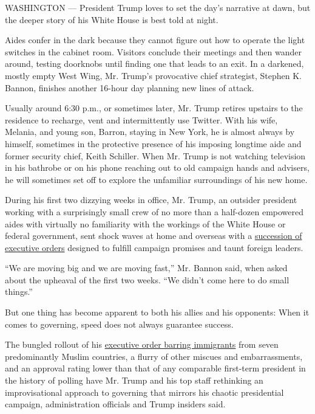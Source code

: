 WASHINGTON --- President Trump loves to set the day's narrative at dawn,
but the deeper story of his White House is best told at night.

Aides confer in the dark because they cannot figure out how to operate
the light switches in the cabinet room. Visitors conclude their meetings
and then wander around, testing doorknobs until finding one that leads
to an exit. In a darkened, mostly empty West Wing, Mr. Trump's
provocative chief strategist, Stephen K. Bannon, finishes another
16-hour day planning new lines of attack.

Usually around 6:30 p.m., or sometimes later, Mr. Trump retires upstairs
to the residence to recharge, vent and intermittently use Twitter. With
his wife, Melania, and young son, Barron, staying in New York, he is
almost always by himself, sometimes in the protective presence of his
imposing longtime aide and former security chief, Keith Schiller. When
Mr. Trump is not watching television in his bathrobe or on his phone
reaching out to old campaign hands and advisers, he will sometimes set
off to explore the unfamiliar surroundings of his new home.

During his first two dizzying weeks in office, Mr. Trump, an outsider
president working with a surprisingly small crew of no more than a
half-dozen empowered aides with virtually no familiarity with the
workings of the White House or federal government, sent shock waves at
home and overseas with a
\href{https://www.nytimes3xbfgragh.onion/interactive/2017/us/politics/trump-agenda-tracker.html?_r=0}{succession
of executive orders} designed to fulfill campaign promises and taunt
foreign leaders.

``We are moving big and we are moving fast,'' Mr. Bannon said, when
asked about the upheaval of the first two weeks. ``We didn't come here
to do small things.''

But one thing has become apparent to both his allies and his opponents:
When it comes to governing, speed does not always guarantee success.

The bungled rollout of his
\href{https://www.nytimes3xbfgragh.onion/2017/01/29/us/trump-refugee-ban-muslim-executive-order.html}{executive
order barring immigrants} from seven predominantly Muslim countries, a
flurry of other miscues and embarrassments, and an approval rating lower
than that of any comparable first-term president in the history of
polling have Mr. Trump and his top staff rethinking an improvisational
approach to governing that mirrors his chaotic presidential campaign,
administration officials and Trump insiders said.

